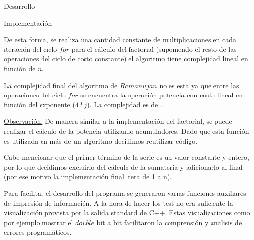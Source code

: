 \begin{section}{Desarrollo}
\begin{subsection}{Implementación}
\begin{itemize}
		\VSP
		
		De esta forma, se realiza una cantidad constante de multiplicaciones en cada iteración del ciclo $for$ para el cálculo del factorial (suponiendo el resto de las operaciones del ciclo de costo constante) el algoritmo tiene complejidad lineal en función de $n$.
		
		La complejidad final del algoritmo de $Ramanujan$ no es esta ya que entre las operaciones del ciclo $for$ se encuentra la operación potencia con costo lineal en función del exponente ($4*j$). La complejidad es de .
		
		\underline{Observación:} De manera similar a la implementación del factorial, se puede realizar el cálculo de la potencia utilizando acumuladores. Dado que esta función es utilizada en más de un algoritmo decidimos reutilizar código.
		
		Cabe mencionar que el primer término de la serie es un valor constante y entero, por lo que decidimos excluirlo del cálculo de la sumatoria y adicionarlo al final (por ese motivo la implementación final itera de 1 a n).
		\end{itemize}
		
		Para facilitar el desarrollo del programa se generaron varias funciones auxiliares de impresión de información. A la hora de hacer los test no era suficiente la visualización provista por la salida standard de C++. Estas visualizaciones como por ejemplo mostrar el $double$ bit a bit facilitaron la comprensión y analisis de errores programáticos.
		
	\end{subsection}
\end{section}
